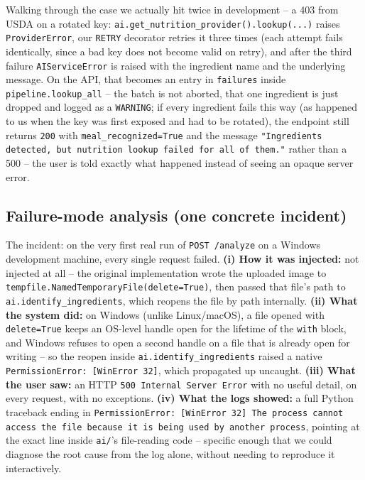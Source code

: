 \documentclass[11pt,a4paper]{article}
\begin{document}
Walking through the case we actually hit twice in development -- a 403 from USDA on a rotated key: \texttt{ai.get\_nutrition\_provider().lookup(...)} raises \texttt{ProviderError}, our \texttt{RETRY} decorator retries it three times (each attempt fails identically, since a bad key does not become valid on retry), and after the third failure \texttt{AIServiceError} is raised with the ingredient name and the underlying message. On the API, that becomes an entry in \texttt{failures} inside \texttt{pipeline.lookup\_all} -- the batch is not aborted, that one ingredient is just dropped and logged as a \texttt{WARNING}; if every ingredient fails this way (as happened to us when the key was first exposed and had to be rotated), the endpoint still returns \texttt{200} with \texttt{meal\_recognized=True} and the message \texttt{"Ingredients detected, but nutrition lookup failed for all of them."} rather than a 500 -- the user is told exactly what happened instead of seeing an opaque server error.

\subsection{Failure-mode analysis (one concrete incident)}

The incident: on the very first real run of \texttt{POST /analyze} on a Windows development machine, every single request failed. \textbf{(i) How it was injected:} not injected at all -- the original implementation wrote the uploaded image to \texttt{tempfile.NamedTemporaryFile(delete=True)}, then passed that file's path to \texttt{ai.identify\_ingredients}, which reopens the file by path internally. \textbf{(ii) What the system did:} on Windows (unlike Linux/macOS), a file opened with \texttt{delete=True} keeps an OS-level handle open for the lifetime of the \texttt{with} block, and Windows refuses to open a second handle on a file that is already open for writing -- so the reopen inside \texttt{ai.identify\_ingredients} raised a native \texttt{PermissionError: [WinError 32]}, which propagated up uncaught. \textbf{(iii) What the user saw:} an HTTP \texttt{500 Internal Server Error} with no useful detail, on every request, with no exceptions. \textbf{(iv) What the logs showed:} a full Python traceback ending in \texttt{PermissionError: [WinError 32] The process cannot access the file because it is being used by another process}, pointing at the exact line inside \texttt{ai/}'s file-reading code -- specific enough that we could diagnose the root cause from the log alone, without needing to reproduce it interactively.
\end{document}
